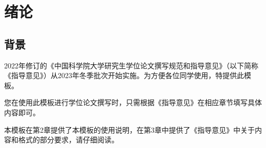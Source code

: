 \chapter{绪论}\label{chap:introduction}{

\section{背景}

2022年修订的《中国科学院大学研究生学位论文撰写规范和指导意见》（以下简称《指导意见》）从2023年冬季批次开始实施。为方便各位同学使用，特提供此模板。

您在使用此模板进行学位论文撰写时，只需根据《指导意见》在相应章节填写具体内容即可。

本模板在第2章提供了本模板的使用说明，在第3章中提供了《指导意见》中关于内容和格式的部分要求，请仔细阅读。


}

